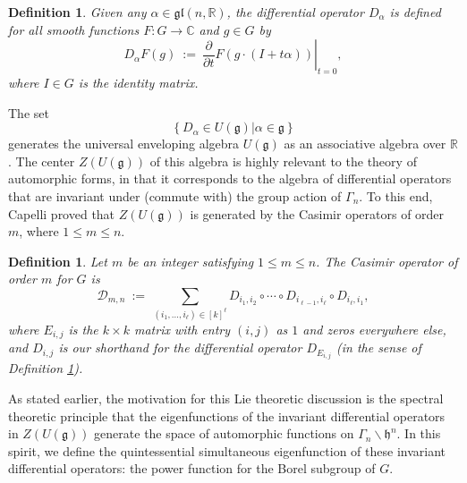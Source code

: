 \documentclass[12pt, reqno, oneside]{amsart}
\newtheorem{definition}[corollary]{Definition}
\numberwithin{equation}{section}
\begin{document}
\begin{definition}\label{def:differential-operator}
Given any $\alpha \in \mathfrak{gl}(n,\mathbb{R})$, the differential operator $D_\alpha$ is defined for all smooth functions $F:G \to \mathbb{C}$ and $g \in G$ by 
$$D_\alpha F(g) \ := \ \left.\frac{\partial}{\partial t}F(g \cdot (I+t\alpha))\right|_{t=0},$$ where $I \in G$ is the identity matrix.   
\end{definition}
The set $$\left\{\left.D_\alpha\in U(\mathfrak{g})\right|\alpha\in\mathfrak{g}\right\}$$ generates the universal enveloping algebra $U(\mathfrak{g})$ as an associative algebra over $\mathbb{R}$. The center $Z(U(\mathfrak{g}))$ of this algebra is highly relevant to the theory of automorphic forms, in that it corresponds to the algebra of differential operators that are invariant under (commute with) the group action of $\Gamma_n$. To this end, Capelli \cite{Cap87} proved that $Z(U(\mathfrak{g}))$ is generated by the Casimir operators of order $m$, where $1 \leq m \leq n$.

\begin{definition}\label{def:casimir-operator}
Let $m$ be an integer satisfying $1 \leq m \leq n$. The Casimir operator of order $m$ for $G$ is
\begin{equation}
\mathcal{D}_{m,n} \ := \ \sum_{(i_1,\dots,i_\ell) \in [k]^{\ell}}D_{i_1,i_2} \circ \cdots \circ D_{i_{\ell-1},i_\ell} \circ D_{i_\ell,i_1},
\end{equation}
where $E_{i,j}$ is the $k\times k$ matrix with entry $(i,j)$ as $1$ and zeros everywhere else, and $D_{i,j}$ is our shorthand for the differential operator $D_{E_{i,j}}$ (in the sense of Definition \ref{def:differential-operator}). 
\end{definition}

As stated earlier, the motivation for this Lie theoretic discussion is the spectral theoretic principle that the eigenfunctions of the invariant differential operators in $Z(U(\mathfrak{g}))$ generate the space of automorphic functions on $\Gamma_n \backslash \mathfrak{h}^n$. In this spirit, we define the quintessential simultaneous eigenfunction of these invariant differential operators: the power function for the Borel subgroup of $G$. 
\end{document}
